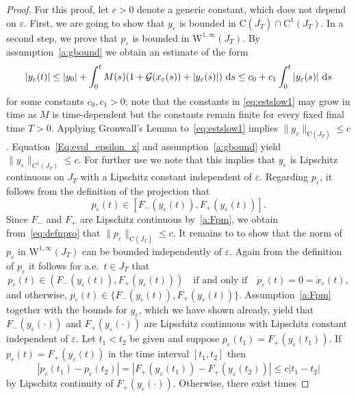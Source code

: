 \documentclass[12pt]{article}
\def\txtd{{\textnormal{d}}}
\newcommand{\be}{\begin{equation}}
\newcommand{\ee}{\end{equation}}
\newcommand{\benn}{\begin{equation*}}
\newcommand{\eenn}{\end{equation*}}
\newcommand{\cG}{{\mathcal G}}  %
\begin{document}
\begin{proof}
For this proof, let $c>0$ denote a generic constant, which does not depend on 
$\varepsilon$. First, we are going to show that $y_{\varepsilon}$ is bounded 
in $\mathrm{C}(\overline{J_T})\cap\mathrm{C}^1(J_T)$. In a second step, we prove that 
$p_{\varepsilon}$ is bounded in $\mathrm{W}^{1,\infty}(J_T)$. By assumption~\ref{a:gbound}
we obtain an estimate of the form
\be
\label{eq:estslow1}
|y_\varepsilon(t)|\leq |y_0| + \int_0^t M(s) (1 + \cG(x_\varepsilon(s)) 
+ |y_\varepsilon(s)|) ~\txtd s \leq c_0 + c_1 \int_0^t |y_\varepsilon(s)|~\txtd s
\ee
for some constants $c_0,c_1>0$; note that the constants in \eqref{eq:estslow1} may grow
in time as $M$ is time-dependent but the constants remain finite for every fixed final 
time $T>0$. Applying Gronwall's Lemma to~\eqref{eq:estslow1} implies 
$\|y_\varepsilon\|_{\mathrm{C}(\overline{J_T})} \leq c$. Equation~\eqref{Eq:evol_epsilon_x} 
and assumption~\ref{a:gbound} yield $\|y_\varepsilon\|_{\mathrm{C}^1(J_T)} \leq c$. For 
further use we note that this implies that $y_\varepsilon$ is Lipschitz continuous on 
$J_T$ with a Lipschitz constant independent of $\varepsilon$. Regarding $p_\varepsilon$, 
it follows from the definition of the projection that
\be
\label{eq:defnpro}
p_\varepsilon(t) \in [F_-(y_\varepsilon(t)) , F_+(y_\varepsilon(t))].
\ee
Since $F_-$ and $F_+$ are Lipschitz continuous by~\ref{a:Fpm}, we obtain 
from~\eqref{eq:defnpro} that $\|p_\varepsilon\|_{\mathrm{C}(\overline{J_T})} \leq c$. It 
remains to to show that the norm of $p_\varepsilon$ in $\mathrm{W}^{1,\infty}(J_T)$ can 
be bounded independently of $\varepsilon$. Again from the definition of $p_\varepsilon$ 
it follows for a.e.~$t\in J_T$ that
\benn
p_\varepsilon(t) \in (F_-(y_\varepsilon(t)) , F_+(y_\varepsilon(t))) \quad 
\text{if and only if}\quad  \dot{p}_\varepsilon(t)=0=\dot{x}_\varepsilon(t),
\eenn
and otherwise, $p_\varepsilon(t) \in \{F_-(y_\varepsilon(t)),F_+(y_\varepsilon(t))\}$.
Assumption~\ref{a:Fpm} together with the bounds for $y_\varepsilon$, which we have shown 
already, yield that $F_-(y_\varepsilon(\cdot))$ and $F_+(y_\varepsilon(\cdot))$ are Lipschitz 
continuous with Lipschitz constant independent of $\varepsilon$. Let $t_1<t_2$ be given and 
suppose $p_\varepsilon(t_1)=F_+(y_\varepsilon(t_1))$. If $p_\varepsilon(t)=
F_+(y_\varepsilon(t))$ in the time interval $[t_1,t_2]$ then
\benn
|p_\varepsilon(t_1) - p_\varepsilon(t_2)|=  
|F_+(y_\varepsilon(t_1))-F_+(y_\varepsilon(t_2))| \leq c |t_1-t_2|
\eenn
by Lipschitz continuity of $F_+(y_\varepsilon(\cdot))$. Otherwise, there exist times 

\end{proof}
\end{document}
